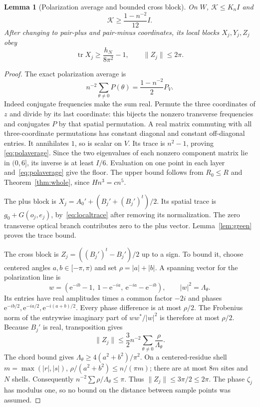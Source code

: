 \documentclass[11pt]{article}
\newcommand{\norm}[1]{\lVert#1\rVert}
\newcommand{\e}{\mathrm e}
\DeclareMathOperator{\tr}{tr}
\newtheorem{lemma}[theorem]{Lemma}
\theoremstyle{definition}
\theoremstyle{remark}
\begin{document}
\begin{lemma}[Polarization average and bounded cross block]\label{lem:cross}
On $W$, $\mathcal K\le K_n I$ and
\[
 \mathcal K\ge\frac{1-n^{-2}}{12}I.
\]
After changing to pair-plus and pair-minus coordinates, its local blocks
$X_j,Y_j,Z_j$ obey
\[
 \tr X_j\ge \frac{h_N}{8\pi^2}-1,
 \qquad \norm{Z_j}\le2\pi.
\]
\end{lemma}
\begin{proof}
The exact polarization average is
\begin{equation}\label{eq:polaverage}
 n^{-2}\sum_{\theta\ne0}P(\theta)=\frac{1-n^{-2}}2P_V.
\end{equation}
Indeed conjugate frequencies make the sum real. Permute the three
coordinates of $z$ and divide by its last coordinate: this bijects the
nonzero transverse frequencies and conjugates $P$ by that spatial
permutation. A real matrix commuting with all three-coordinate
permutations has constant diagonal and constant off-diagonal entries.
It annihilates $1$, so is scalar on $V$. Its trace is $n^2-1$, proving
\eqref{eq:polaverage}. Since the two eigenvalues of each nonzero component
matrix lie in $(0,6]$, its inverse is at least $I/6$.
Evaluation on one point in each layer and~\eqref{eq:polaverage} give the
floor. The upper bound follows from $R_0\le R$ and
Theorem~\ref{thm:whole}, since $Hn^3=cn^5$.

The plus block is $X_j=A_0'+(B_j'+(B_j')^t)/2$. Its spatial trace is
$g_0+G(o_j,e_j)$, by~\eqref{eq:localtrace} after removing its normalization.
The zero transverse optical branch contributes zero to the plus vector.
Lemma~\ref{lem:green} proves the trace bound.

The cross block is $Z_j=((B_j')^t-B_j')/2$ up to a sign. To bound it,
choose centered angles $a,b\in[-\pi,\pi)$ and set $\rho=|a|+|b|$.
A spanning vector for the polarization line is
\[
 w=(\e^{-ib}-1,\ 1-\e^{-ia},\ \e^{-ia}-\e^{-ib}),
 \qquad |w|^2=\Lambda_\theta.
\]
Its entries have real amplitudes times a common factor $-2i$ and phases
$\e^{-ib/2},\e^{-ia/2},\e^{-i(a+b)/2}$. Every phase difference is at
most $\rho/2$. The Frobenius norm of the entrywise imaginary part of
$ww^*/|w|^2$ is therefore at most $\rho/2$. Because $B_j'$ is real,
transposition gives
\[
 \norm{Z_j}\le\frac32 n^{-2}
                   \sum_{\theta\ne0}\frac{\rho}{\Lambda_\theta}.
\]
The chord bound gives $\Lambda_\theta\ge4(a^2+b^2)/\pi^2$.
On a centered-residue shell $m=\max(|r|,|s|)$,
$\rho/(a^2+b^2)\le n/(\pi m)$; there are at most $8m$ sites and
$N$ shells. Consequently $n^{-2}\sum\rho/\Lambda_\theta\le\pi$.
Thus $\norm{Z_j}\le3\pi/2\le2\pi$. The phase $\zeta_j$ has modulus
one, so no bound on the distance between sample points was assumed.
\end{proof}
\end{document}
